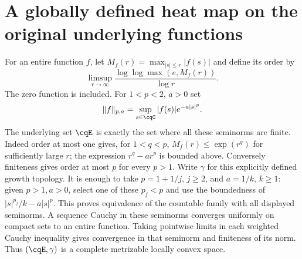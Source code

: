 \section{A globally defined heat map on the original underlying functions}
\label{sec:cq-heatspace}
For an entire function $f$, let
$M_f(r)=\max_{|s|\leq r}|f(s)|$ and define its order by
\[
 \limsup_{r\to\infty}
       \frac{\log\log\max(e,M_f(r))}{\log r}.
\]
The zero function is included. For $1<p<2$, $a>0$ set
\[
 \|f\|_{p,a}=\sup_{s\in\cqC}|f(s)|e^{-a|s|^p}.
\]
The underlying set $\cqE$ is exactly the set where all these seminorms
are finite. Indeed order at most one gives, for $1<q<p$,
$M_f(r)\leq\exp(r^q)$ for sufficiently large $r$; the expression
$r^q-ar^p$ is bounded above. Conversely finiteness gives order at
most $p$ for every $p>1$.
Write $\gamma$ for this explicitly defined growth topology.
It is enough to take $p=1+1/j$, $j\geq2$, and $a=1/k$, $k\geq1$:
given $p>1,a>0$, select one of these $p_j<p$ and use the boundedness
of $|s|^{p_j}/k-a|s|^p$. This proves equivalence of the countable
family with all displayed seminorms. A sequence Cauchy in these
seminorms converges uniformly on compact sets to an entire function.
Taking pointwise limits in each weighted Cauchy inequality gives
convergence in that seminorm and finiteness of its norm. Thus
$(\cqE,\gamma)$ is a complete metrizable locally convex space.

